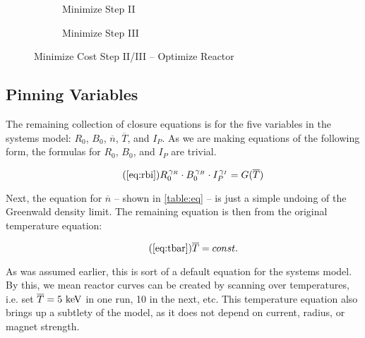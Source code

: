 \begin{figure*}
    \centering
    \begin{subfigure}[t]{0.8\textwidth}
        \centering
		\begin{adjustbox}{width=\textwidth}
			
		\end{adjustbox}
        \caption{ Minimize Step II }
    \end{subfigure} 
    \par \bigskip \par \bigskip 
    \begin{subfigure}[t]{0.8\textwidth}
        \centering
		\begin{adjustbox}{width=\textwidth}
			
		\end{adjustbox}
        \caption{ Minimize Step III }
    \end{subfigure}
    \par \bigskip \par \bigskip    
    \caption{Minimize Cost Step II/III -- Optimize Reactor}
    \label{fig:minimize} 
\end{figure*}

\subsection{Pinning  Variables} 

The remaining collection of closure equations is for the five  variables in the systems model: $R_0$, $B_0$, $\overline n$, $\overline T$, and $I_P$. As we are making equations of the following form, the formulas for $R_0$, $B_0$, and $I_P$ are trivial.

\begin{equation}
	\tag{\ref{eq:rbi}}
	R_0^{\, \gamma_R} \cdot B_0^{\, \gamma_B} \cdot I_P^{\, \gamma_I} = G( \overline T )
\end{equation}

Next, the equation for $\overline n$ -- shown in \cref{table:eq} -- is just a simple undoing of the Greenwald density limit. The remaining equation is then from the original temperature equation:

\begin{equation}
	\tag{\ref{eq:tbar}}
	\overline T = const.
\end{equation}

As was assumed earlier, this is sort of a default equation for the systems model. By this, we mean reactor curves can be created by scanning over temperatures, i.e. set $\overline T = 5 \ \textnormal{keV}$ in one run, 10 in the next, etc. This temperature equation also brings up a subtlety of the model, as it does not depend on current, radius, or magnet strength.

